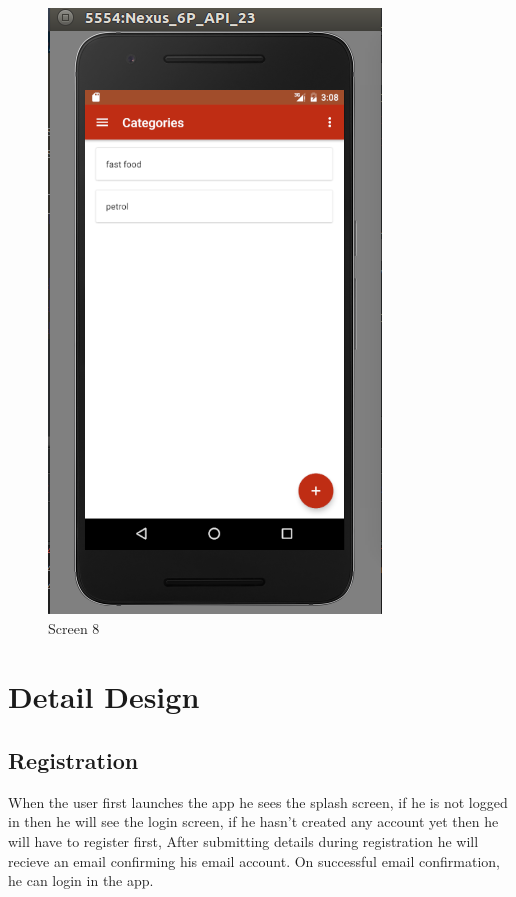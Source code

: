 \begin{figure}[ht]
\centering
\includegraphics[scale=0.38]{images/s8.png}
\caption{Screen 8}
\label{fig:8}
\end{figure}
\fi

\section{Detail Design}

	\subsection{Registration}
	When the user first launches the app he sees the splash screen, if he is not logged in then he will see the login screen, if he hasn't created any account yet then he will have to register first, After submitting details during registration he will recieve an email confirming his email account. On successful email confirmation, he can login in the app. \\
	
